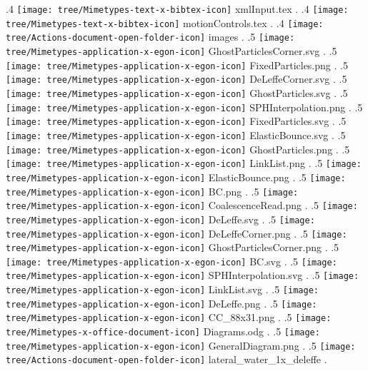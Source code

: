 {.4 { \texttt{[image: tree/Mimetypes-text-x-bibtex-icon]} xmlInput.tex }.
.4 { \texttt{[image: tree/Mimetypes-text-x-bibtex-icon]} motionControls.tex }.
.4 { \texttt{[image: tree/Actions-document-open-folder-icon]} images }.
.5 { \texttt{[image: tree/Mimetypes-application-x-egon-icon]} GhostParticlesCorner.svg }.
.5 { \texttt{[image: tree/Mimetypes-application-x-egon-icon]} FixedParticles.png }.
.5 { \texttt{[image: tree/Mimetypes-application-x-egon-icon]} DeLeffeCorner.svg }.
.5 { \texttt{[image: tree/Mimetypes-application-x-egon-icon]} GhostParticles.svg }.
.5 { \texttt{[image: tree/Mimetypes-application-x-egon-icon]} SPHInterpolation.png }.
.5 { \texttt{[image: tree/Mimetypes-application-x-egon-icon]} FixedParticles.svg }.
.5 { \texttt{[image: tree/Mimetypes-application-x-egon-icon]} ElasticBounce.svg }.
.5 { \texttt{[image: tree/Mimetypes-application-x-egon-icon]} GhostParticles.png }.
.5 { \texttt{[image: tree/Mimetypes-application-x-egon-icon]} LinkList.png }.
.5 { \texttt{[image: tree/Mimetypes-application-x-egon-icon]} ElasticBounce.png }.
.5 { \texttt{[image: tree/Mimetypes-application-x-egon-icon]} BC.png }.
.5 { \texttt{[image: tree/Mimetypes-application-x-egon-icon]} CoalescenceRead.png }.
.5 { \texttt{[image: tree/Mimetypes-application-x-egon-icon]} DeLeffe.svg }.
.5 { \texttt{[image: tree/Mimetypes-application-x-egon-icon]} DeLeffeCorner.png }.
.5 { \texttt{[image: tree/Mimetypes-application-x-egon-icon]} GhostParticlesCorner.png }.
.5 { \texttt{[image: tree/Mimetypes-application-x-egon-icon]} BC.svg }.
.5 { \texttt{[image: tree/Mimetypes-application-x-egon-icon]} SPHInterpolation.svg }.
.5 { \texttt{[image: tree/Mimetypes-application-x-egon-icon]} LinkList.svg }.
.5 { \texttt{[image: tree/Mimetypes-application-x-egon-icon]} DeLeffe.png }.
.5 { \texttt{[image: tree/Mimetypes-application-x-egon-icon]} CC\_88x31.png }.
.5 { \texttt{[image: tree/Mimetypes-x-office-document-icon]} Diagrams.odg }.
.5 { \texttt{[image: tree/Mimetypes-application-x-egon-icon]} GeneralDiagram.png }.
.5 { \texttt{[image: tree/Actions-document-open-folder-icon]} lateral\_water\_1x\_deleffe }.
}
